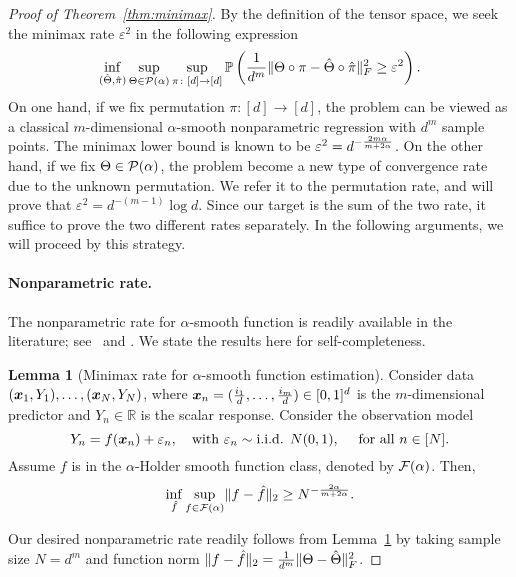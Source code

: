 \documentclass[11pt]{article}
\theoremstyle{definition}
\newtheorem{lem}[thm]{Lemma}
\begin{document}
\begin{proof}[Proof of Theorem~\ref{thm:minimax}] By the definition of the tensor space, we seek the minimax rate $\varepsilon^2$ in the following expression
\[
\inf_{(\hat \Theta,\hat \pi)}\sup_{\Theta\in \mathcal{P}(\alpha)}\sup_{\pi\colon [d]\to[d]} \mathbb{P}\left({1\over d^m}\lVert\Theta\circ \pi-\hat \Theta\circ \hat \pi\rVert_F^2 \geq \varepsilon^2 \right).
\]
On one hand, if we fix permutation $\pi\colon[d]\to[d]$, the problem can be viewed as a classical $m$-dimensional $\alpha$-smooth nonparametric regression with $d^m$ sample points. The minimax lower bound is known to be $\varepsilon^2=d^{-{2m\alpha\over m+2\alpha}}$. On the other hand, if we fix $\Theta\in\mathcal{P}(\alpha)$, the problem become a new type of convergence rate due to the unknown permutation. We refer it to the permutation rate, and will prove that $\varepsilon^2=d^{-(m-1)}\log d$. Since our target is the sum of the two rate, it suffice to prove the two different rates separately. In the following arguments, we will proceed by this strategy. 

\paragraph{Nonparametric rate.} The nonparametric rate for $\alpha$-smooth function is readily available in the literature; see \citet[Example 16]{Wassermantext}~and \citet[Section 2]{stone1982optimal}. We state the results here for self-completeness. 

\begin{lem}[Minimax rate for $\alpha$-smooth function estimation]\label{lem:non} Consider data $(\bm x_1,Y_1), \ldots, (\bm x_N,Y_N)$, where $\bm x_n=({i_1\over d},\ldots,{i_m\over d})\in[0,1]^d$ is the $m$-dimensional predictor and $Y_n\in\mathbb{R}$ is the scalar response. Consider the observation model
\[
Y_n=f(\mx_n)+\varepsilon_n,\quad \text{with}\ \varepsilon_n \sim \text{i.i.d. }  N(0,1), \quad\text{ for all }n\in[N].
\]
Assume $f$ is in the $\alpha$-Holder smooth function class, denoted by $\mathcal{F}(\alpha)$. Then,
\[
\inf_{\hat f}\sup_{f\in \mathcal{F}(\alpha)}\lVert f-\hat f\rVert_2\geq N^{-{2\alpha\over m+2\alpha}}.
\]
\end{lem}
Our desired nonparametric rate readily follows from Lemma~\ref{lem:non} by taking sample size $N=d^m$ and function norm $\lVert f-\hat f\rVert_2={1\over d^m}\lVert\Theta-\hat \Theta\rVert_F^2$.


\end{proof}
\end{document}
